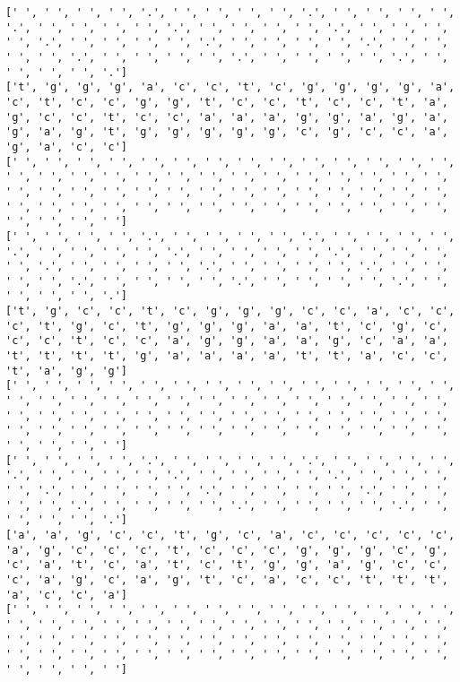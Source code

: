 \documentclass{article}
\begin{document}
\begin{Verbatim}
[' ', ' ', ' ', ' ', '.', ' ', ' ', ' ', ' ', '.', ' ', ' ', ' ', ' ', '.', ' ', ' ', ' ', ' ', '.', ' ', ' ', ' ', ' ', '.', ' ', ' ', ' ', ' ', '.', ' ', ' ', ' ', ' ', '.', ' ', ' ', ' ', ' ', '.', ' ', ' ', ' ', ' ', '.', ' ', ' ', ' ', ' ', '.', ' ', ' ', ' ', ' ', '.', ' ', ' ', ' ', ' ', '.']
['t', 'g', 'g', 'g', 'a', 'c', 'c', 't', 'c', 'g', 'g', 'g', 'g', 'a', 'c', 't', 'c', 'c', 'g', 'g', 't', 'c', 'c', 't', 'c', 'c', 't', 'a', 'g', 'c', 'c', 't', 'c', 'c', 'a', 'a', 'a', 'g', 'g', 'a', 'g', 'a', 'g', 'a', 'g', 't', 'g', 'g', 'g', 'g', 'g', 'c', 'g', 'c', 'c', 'a', 'g', 'a', 'c', 'c']
[' ', ' ', ' ', ' ', ' ', ' ', ' ', ' ', ' ', ' ', ' ', ' ', ' ', ' ', ' ', ' ', ' ', ' ', ' ', ' ', ' ', ' ', ' ', ' ', ' ', ' ', ' ', ' ', ' ', ' ', ' ', ' ', ' ', ' ', ' ', ' ', ' ', ' ', ' ', ' ', ' ', ' ', ' ', ' ', ' ', ' ', ' ', ' ', ' ', ' ', ' ', ' ', ' ', ' ', ' ', ' ', ' ', ' ', ' ', ' ']
[' ', ' ', ' ', ' ', '.', ' ', ' ', ' ', ' ', '.', ' ', ' ', ' ', ' ', '.', ' ', ' ', ' ', ' ', '.', ' ', ' ', ' ', ' ', '.', ' ', ' ', ' ', ' ', '.', ' ', ' ', ' ', ' ', '.', ' ', ' ', ' ', ' ', '.', ' ', ' ', ' ', ' ', '.', ' ', ' ', ' ', ' ', '.', ' ', ' ', ' ', ' ', '.', ' ', ' ', ' ', ' ', '.']
['t', 'g', 'c', 'c', 't', 'c', 'g', 'g', 'g', 'c', 'c', 'a', 'c', 'c', 'c', 't', 'g', 'c', 't', 'g', 'g', 'g', 'a', 'a', 't', 'c', 'g', 'c', 'c', 'c', 't', 'c', 'c', 'a', 'g', 'g', 'a', 'a', 'g', 'c', 'a', 'a', 't', 't', 't', 't', 'g', 'a', 'a', 'a', 'a', 't', 't', 'a', 'c', 'c', 't', 'a', 'g', 'g']
[' ', ' ', ' ', ' ', ' ', ' ', ' ', ' ', ' ', ' ', ' ', ' ', ' ', ' ', ' ', ' ', ' ', ' ', ' ', ' ', ' ', ' ', ' ', ' ', ' ', ' ', ' ', ' ', ' ', ' ', ' ', ' ', ' ', ' ', ' ', ' ', ' ', ' ', ' ', ' ', ' ', ' ', ' ', ' ', ' ', ' ', ' ', ' ', ' ', ' ', ' ', ' ', ' ', ' ', ' ', ' ', ' ', ' ', ' ', ' ']
[' ', ' ', ' ', ' ', '.', ' ', ' ', ' ', ' ', '.', ' ', ' ', ' ', ' ', '.', ' ', ' ', ' ', ' ', '.', ' ', ' ', ' ', ' ', '.', ' ', ' ', ' ', ' ', '.', ' ', ' ', ' ', ' ', '.', ' ', ' ', ' ', ' ', '.', ' ', ' ', ' ', ' ', '.', ' ', ' ', ' ', ' ', '.', ' ', ' ', ' ', ' ', '.', ' ', ' ', ' ', ' ', '.']
['a', 'a', 'g', 'c', 'c', 't', 'g', 'c', 'a', 'c', 'c', 'c', 'c', 'c', 'a', 'g', 'c', 'c', 'c', 't', 'c', 'c', 'c', 'g', 'g', 'g', 'c', 'g', 'c', 'a', 't', 'c', 'a', 't', 'c', 't', 'g', 'g', 'a', 'g', 'c', 'c', 'c', 'a', 'g', 'c', 'a', 'g', 't', 'c', 'a', 'c', 'c', 't', 't', 't', 'a', 'c', 'c', 'a']
[' ', ' ', ' ', ' ', ' ', ' ', ' ', ' ', ' ', ' ', ' ', ' ', ' ', ' ', ' ', ' ', ' ', ' ', ' ', ' ', ' ', ' ', ' ', ' ', ' ', ' ', ' ', ' ', ' ', ' ', ' ', ' ', ' ', ' ', ' ', ' ', ' ', ' ', ' ', ' ', ' ', ' ', ' ', ' ', ' ', ' ', ' ', ' ', ' ', ' ', ' ', ' ', ' ', ' ', ' ', ' ', ' ', ' ', ' ', ' ']

\end{Verbatim}
\end{document}

